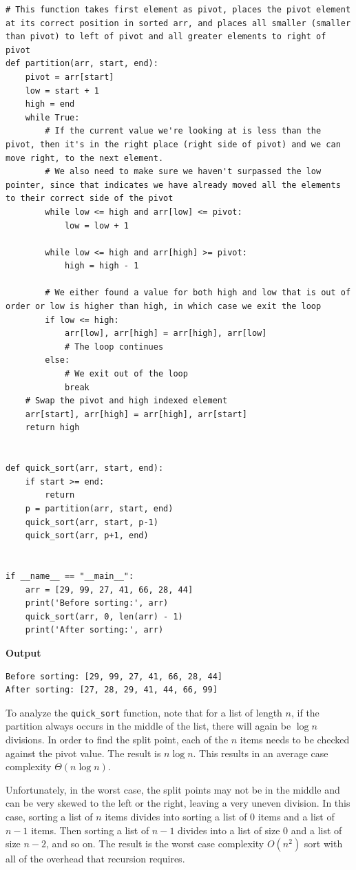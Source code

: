 \documentclass[a4paper,11pt]{book}
\begin{document}
\begin{lstlisting}
# This function takes first element as pivot, places the pivot element at its correct position in sorted arr, and places all smaller (smaller than pivot) to left of pivot and all greater elements to right of pivot 
def partition(arr, start, end):
    pivot = arr[start]
    low = start + 1
    high = end
    while True:
        # If the current value we're looking at is less than the pivot, then it's in the right place (right side of pivot) and we can move right, to the next element. 
        # We also need to make sure we haven't surpassed the low pointer, since that indicates we have already moved all the elements to their correct side of the pivot
        while low <= high and arr[low] <= pivot:
            low = low + 1
        
        while low <= high and arr[high] >= pivot:
            high = high - 1

        # We either found a value for both high and low that is out of order or low is higher than high, in which case we exit the loop
        if low <= high:
            arr[low], arr[high] = arr[high], arr[low]
            # The loop continues
        else:
            # We exit out of the loop
            break
    # Swap the pivot and high indexed element
    arr[start], arr[high] = arr[high], arr[start]
    return high


def quick_sort(arr, start, end):
    if start >= end:
        return
    p = partition(arr, start, end)
    quick_sort(arr, start, p-1)
    quick_sort(arr, p+1, end)


if __name__ == "__main__":
    arr = [29, 99, 27, 41, 66, 28, 44]
    print('Before sorting:', arr)
    quick_sort(arr, 0, len(arr) - 1)
    print('After sorting:', arr)
\end{lstlisting}
\textbf{Output}
\begin{lstlisting}
Before sorting: [29, 99, 27, 41, 66, 28, 44]
After sorting: [27, 28, 29, 41, 44, 66, 99]
\end{lstlisting}

\noindent To analyze the \lstinline{quick_sort} function, note that for a list of length $n$, if the partition always occurs in the middle of the list, there will again be $\log n$ divisions. In order to find the split point, each of the $n$ items needs to be checked against the pivot value. The result is $n\log n$. This results in an average case complexity $\Theta(n\log n)$.

\noindent Unfortunately, in the worst case, the split points may not be in the middle and can be very skewed to the left or the right, leaving a very uneven division. In this case, sorting a list of $n$ items divides into sorting a list of 0 items and a list of $n-1$ items. Then sorting a list of $n-1$ divides into a list of size 0 and a list of size $n-2$, and so on. The result is the worst case complexity $O(n^2)$ sort with all of the overhead that recursion requires.
\end{document}
